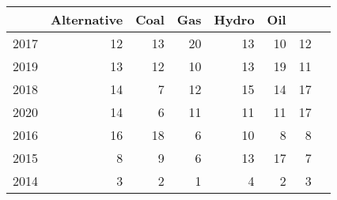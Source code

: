 \begin{table}[ht]
\centering
\begin{tabular}{rrrrrrrr}
  \hline
 & Alternative & Coal & Gas & Hydro & Oil  \\ 
  \hline
2017 &  12 &  13 &  20 &  13 &  10 &  12 \\ 
  2019 &  13 &  12 &  10 &  13 &  19 &  11 \\ 
  2018 &  14 &   7 &  12 &  15 &  14 &  17 \\ 
  2020 &  14 &   6 &  11 &  11 &  11 &  17 \\ 
  2016 &  16 &  18 &   6 &  10 &   8 &   8 \\ 
  2015 &   8 &   9 &   6 &  13 &  17 &   7  \\ 
  2014 &   3 &   2 &   1 &   4 &   2 &   3  \\ 
   \hline
\end{tabular}
\end{table}
